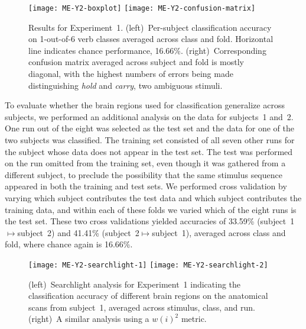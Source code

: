 \begin{figure}
  \begin{center}
      \texttt{[image: ME-Y2-boxplot]}
      \hspace{0.1\textwidth}
      \texttt{[image: ME-Y2-confusion-matrix]}
  \end{center}
  \caption{Results for Experiment~1.
    (left)~Per-subject classification accuracy on 1-out-of-6 verb classes
    averaged across class and fold.
    Horizontal line indicates chance performance, 16.66\%.
    (right)~Corresponding confusion matrix averaged across subject and fold
    is mostly diagonal, with the highest numbers of errors
    being made distinguishing \emph{hold} and \emph{carry}, two ambiguous
    stimuli.}
  \label{fig:ME-Y2-results}
\end{figure}

To evaluate whether the brain regions used for classification generalize across
subjects, we performed an additional analysis on the data for subjects~1 and~2.
%
One run out of the eight was selected as the test set and the data for one of
the two subjects was classified.
%
The training set consisted of all seven other runs for the subject whose
data does not appear in the test set.
%
The test was performed on the run omitted from the training set, even though it
was gathered from a different subject, to preclude the possibility that the
same stimulus sequence appeared in both the training and test sets.
%
We performed cross validation by varying which subject contributes the test
data and which subject contributes the training data, and within each of these
folds we varied which of the eight runs is the test set.
%
These two cross validations yielded accuracies of 33.59\%
(subject~1$\mapsto$subject~2) and 41.41\% (subject~2$\mapsto$subject~1),
averaged across class and fold, where chance again is 16.66\%.

\begin{figure}[t]
  \texttt{[image: ME-Y2-searchlight-1]}
  \hfill
  \texttt{[image: ME-Y2-searchlight-2]}
  \caption{(left)~Searchlight analysis for Experiment~1 indicating the
    classification accuracy of different brain regions on the anatomical scans
    from subject~1, averaged across stimulus, class, and run.
    (right)~A similar analysis using a $w(i)^2$ metric.}
  \label{fig:ME-Y2-searchlight}
\end{figure}

